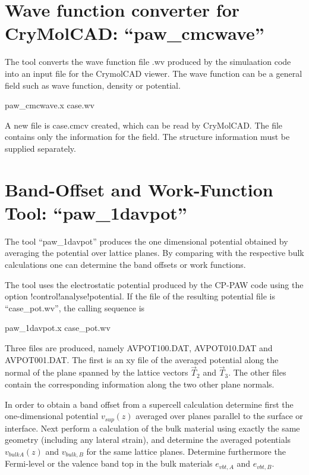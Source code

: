 \documentclass[final,12pt,makeidx,DIV=calc]{article}
\begin{document}
{{{{{{%
\newpage
\section{Wave function converter for CryMolCAD: ``paw\_cmcwave''}
The tool converts the wave function file .wv produced by the
simulaation code into an input file for the CrymolCAD viewer. The wave
function can be a general field such as wave function, density or
potential.
\begin{center}
paw\_cmcwave.x case.wv
\end{center}
A new file is case.cmcv created, which can be read by CryMolCAD. The
file contains only the information for the field. The structure
information must be supplied separately.


\newpage
\section{Band-Offset and Work-Function Tool: ``paw\_1davpot''}
\label{sec:1davpottool}
The tool ``paw\_1davpot'' produces the one dimensional potential
obtained by averaging the potential over lattice planes. By comparing
with the respective bulk calculations one can determine the band
offsets or work functions.

The tool uses the electrostatic potential produced by the CP-PAW code
using the option !control!analyse!potential. If the file of the
resulting potential file is ``case\_pot.wv'',  the calling sequence is
\begin{center}
paw\_1davpot.x case\_pot.wv
\end{center}
Three files are produced, namely AVPOT100.DAT, AVPOT010.DAT and
AVPOT001.DAT. The first is an xy file of the averaged potential along
the normal of the plane spanned by the lattice vectors $\vec{T}_2$ and
$\vec{T}_3$. The other files contain the corresponding information
along the two other plane normals.

In order to obtain a band offset from a supercell calculation
determine first the one-dimensional potential $v_{sup}(z)$ averaged
over planes parallel to the surface or interface. Next perform a
calculation of the bulk material using exactly the same geometry
(including any lateral strain), and determine the averaged potentials
$v_{bulk A}(z)$ and $v_{bulk,B}$ for the same lattice planes.
Determine furthermore the Fermi-level or the valence band top in the bulk
materials $e_{vbt,A}$ and $e_{vbt,B}$.

}}}}}}
\end{document}
